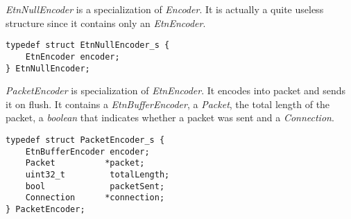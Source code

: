 \emph{EtnNullEncoder} is a specialization of \emph{Encoder}. It is actually a quite useless structure since it contains only an \emph{EtnEncoder}.
\begin{lstlisting}
typedef struct EtnNullEncoder_s {
	EtnEncoder encoder;
} EtnNullEncoder;
\end{lstlisting}
\emph{PacketEncoder} is specialization of \emph{EtnEncoder}. It encodes into packet and sends it on flush. It contains a \emph{EtnBufferEncoder}, a \emph{Packet}, the total length of the packet, a \emph{boolean} that indicates whether a packet was sent and a \emph{Connection}.
\begin{lstlisting}
typedef struct PacketEncoder_s {
	EtnBufferEncoder encoder;
	Packet          *packet;
	uint32_t         totalLength;
	bool             packetSent;
	Connection      *connection;
} PacketEncoder;
\end{lstlisting}
